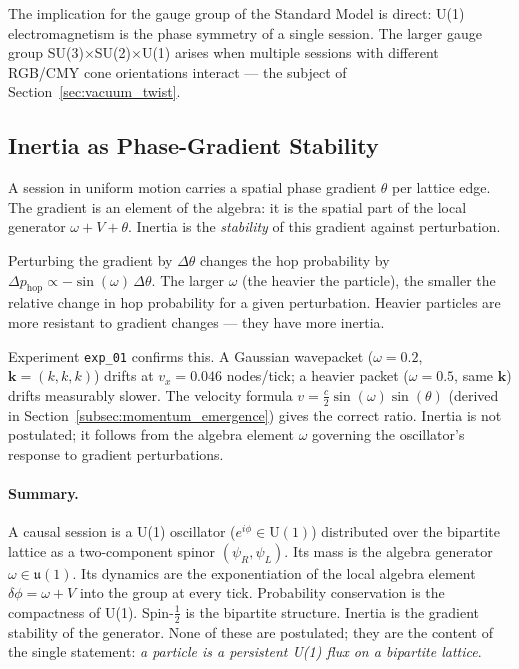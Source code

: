 The implication for the gauge group of the Standard Model is direct:
U(1) electromagnetism is the phase symmetry of a single session.
The larger gauge group SU(3)$\times$SU(2)$\times$U(1) arises when
multiple sessions with different RGB/CMY cone orientations interact —
the subject of Section~\ref{sec:vacuum_twist}.

\subsection{Inertia as Phase-Gradient Stability}
\label{subsec:inertia}

A session in uniform motion carries a spatial phase gradient
$\theta$ per lattice edge.
The gradient is an element of the algebra: it is the spatial part of
the local generator $\omega + V + \theta$.
Inertia is the \emph{stability} of this gradient against perturbation.

Perturbing the gradient by $\Delta\theta$ changes the hop probability by
$\Delta p_\mathrm{hop} \propto -\sin(\omega)\,\Delta\theta$.
The larger $\omega$ (the heavier the particle), the smaller the relative
change in hop probability for a given perturbation.
Heavier particles are more resistant to gradient changes — they have
more inertia.

Experiment \texttt{exp\_01} confirms this.
A Gaussian wavepacket ($\omega = 0.2$, $\mathbf{k} = (k,k,k)$) drifts
at $v_x = 0.046$ nodes/tick; a heavier packet ($\omega = 0.5$, same
$\mathbf{k}$) drifts measurably slower.
The velocity formula $v = \tfrac{c}{2}\sin(\omega)\sin(\theta)$
(derived in Section~\ref{subsec:momentum_emergence}) gives the correct
ratio.
Inertia is not postulated; it follows from the algebra element $\omega$
governing the oscillator's response to gradient perturbations.

\paragraph{Summary.}
A causal session is a U(1) oscillator ($e^{i\phi} \in \mathrm{U}(1)$)
distributed over the bipartite lattice as a two-component spinor
$(\psi_R, \psi_L)$.
Its mass is the algebra generator $\omega \in \mathfrak{u}(1)$.
Its dynamics are the exponentiation of the local algebra element
$\delta\phi = \omega + V$ into the group at every tick.
Probability conservation is the compactness of U(1).
Spin-$\tfrac{1}{2}$ is the bipartite structure.
Inertia is the gradient stability of the generator.
None of these are postulated; they are the content of the single
statement: \emph{a particle is a persistent U(1) flux on a bipartite
lattice}.
